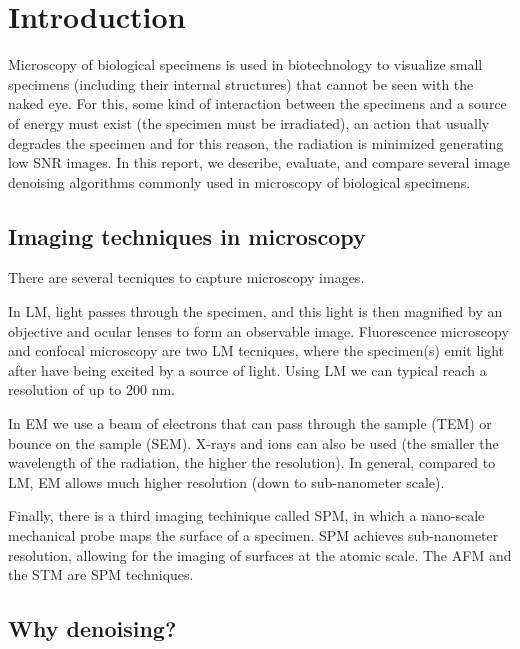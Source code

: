 \chapter{Introduction}

Microscopy of biological specimens is used in biotechnology to
visualize small specimens (including their internal structures) that
cannot be seen with the naked eye. For this, some kind of interaction
between the specimens and a source of energy must exist (the specimen
must be irradiated), an action that usually degrades the specimen and
for this reason, the radiation is minimized generating low SNR
images. In this report, we describe, evaluate, and compare several
image denoising algorithms commonly used in microscopy of biological
specimens.

\section{Imaging techniques in microscopy}

There are several tecniques to capture microscopy images.

In \gls{LM}, light passes through the specimen, and this light is then
magnified by an objective and ocular lenses to form an observable
image. Fluorescence microscopy and confocal microscopy are two
\gls{LM} tecniques, where the specimen(s) emit light after have being
excited by a source of light. Using \gls{LM} we can typical reach a
resolution of up to 200 nm.

In \gls{EM} we use a beam of electrons that can pass through the
sample (\gls{TEM}) or bounce on the sample (\gls{SEM}). X-rays and
ions can also be used (the smaller the wavelength of the radiation,
the higher the resolution). In general, compared to \gls{LM}, \gls{EM}
allows much higher resolution (down to sub-nanometer scale).

Finally, there is a third imaging techinique called \gls{SPM}, in
which a nano-scale mechanical probe maps the surface of a
specimen. \gls{SPM} achieves sub-nanometer resolution, allowing for
the imaging of surfaces at the atomic scale. The \gls{AFM} and the
\gls{STM} are \gls{SPM} techniques.


\section{Why denoising?}


